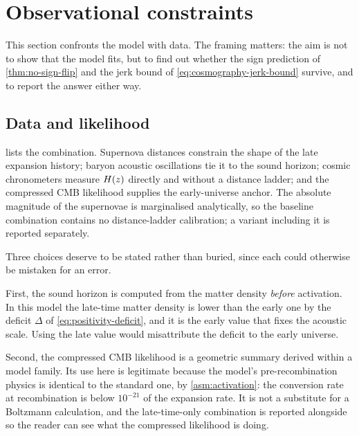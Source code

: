 \section{Observational constraints}\label{sec:observations}

This section confronts the model with data. The framing matters: the aim is
not to show that the model fits, but to find out whether the sign prediction of
\cref{thm:no-sign-flip} and the jerk bound of
\cref{eq:cosmography-jerk-bound} survive, and to report the answer either way.

\subsection{Data and likelihood}\label{sec:observations-data}

\begin{table}[t]
  \centering
  
  \caption{Data sets used. All are public releases; a script downloads each and
    verifies it against a recorded checksum, and none is redistributed with the
    code.}
  \label{tab:datasets}
\end{table}

 lists the combination. Supernova distances constrain the
shape of the late expansion history; baryon acoustic oscillations tie it to the
sound horizon; cosmic chronometers measure $H(z)$ directly and without a
distance ladder; and the compressed CMB likelihood supplies the early-universe
anchor. The absolute magnitude of the supernovae is marginalised analytically,
so the baseline combination contains no distance-ladder calibration; a variant
including it is reported separately.

Three choices deserve to be stated rather than buried, since each could
otherwise be mistaken for an error.

First, the sound horizon is computed from the matter density \emph{before}
activation. In this model the late-time matter density is lower than the early
one by the deficit $\Delta$ of \cref{eq:positivity-deficit}, and it is the
early value that fixes the acoustic scale. Using the late value would
misattribute the deficit to the early universe.

Second, the compressed CMB likelihood is a geometric summary derived within a
model family. Its use here is legitimate because the model's pre-recombination
physics is identical to the standard one, by \cref{asm:activation}: the
conversion rate at recombination is below $10^{-21}$ of the expansion rate. It
is not a substitute for a Boltzmann calculation, and the late-time-only
combination is reported alongside so the reader can see what the compressed
likelihood is doing.

